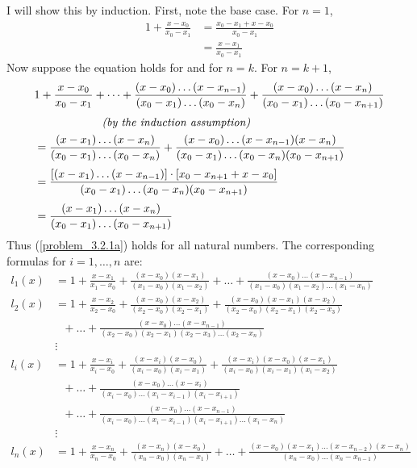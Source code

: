 \documentclass[12pt]{article}
\begin{document}
\noindent I will show this by induction.  First, note the base case.  For $n = 1$,
\begin{align*}
1 + \frac{x - x_0}{x_0 - x_1} &= \frac{x_0 - x_1 + x - x_0}{x_0 - x_1} \\
&= \frac{x - x_1}{x_0 - x_1}
\end{align*}
Now suppose the equation holds for and for $n = k$.  For $n = k+1$,
\begin{align*}
&1 + \frac{x - x_0}{x_0 - x_1} + \dots + \frac{(x - x_0)\dots(x - x_{n-1})}{(x_0 - x_1)\dots(x_0 - x_n)} + \frac{(x - x_0)\dots(x - x_n)}{(x_0 - x_1)\dots(x_0 - x_{n+1})} \\[.1cm]
&\ \ \ \ \ \ \ \ \ \ \ \ \ \ \ \ \ \ \text{\it (by the induction assumption)}\\
&= \frac{(x - x_1)\dots(x - x_n)}{(x_0 - x_1)\dots(x_0 - x_n)} + \frac{(x - x_0)\dots(x - x_{n-1})(x - x_n)}{(x_0 - x_1)\dots(x_0 - x_n)(x_0 - x_{n+1})} \\[.1cm]
&= \frac{[(x - x_1)\dots(x - x_{n-1})]\cdot[x_0 - x_{n+1} + x - x_0]}{(x_0 - x_1)\dots(x_0 - x_n)(x_0 - x_{n+1})} \\[.1cm]
&= \frac{(x - x_1)\dots(x - x_n)}{(x_0 - x_1)\dots(x_0 - x_{n+1})}
\end{align*}
Thus (\ref{problem_3.2.1a}) holds for all natural numbers.  The corresponding formulas for $i = 1, \dots, n$ are:
\begin{align*}
l_1(x) &= 1 + \frac{x - x_1}{x_1 - x_0} + \frac{(x - x_0)(x - x_1)}{(x_1 - x_0)(x_1 - x_2)} + \dots + \frac{(x - x_0)\dots(x - x_{n-1})}{(x_1 - x_0)(x_1 - x_2)\dots(x_1 - x_n)} \\[.1cm]
l_2(x) &= 1 + \frac{x - x_2}{x_2 - x_0} + \frac{(x - x_0)(x - x_2)}{(x_2 - x_0)(x_2 - x_1)} + \frac{(x - x_0)(x - x_1)(x - x_2)}{(x_2 - x_0)(x_2 - x_1)(x_2 - x_3)} \\[.1cm]
&\ \ \ + \dots + \frac{(x - x_0)\dots(x - x_{n-1})}{(x_2 - x_0)(x_2 - x_1)(x_2 - x_3)\dots(x_2 - x_n)}\\[.1cm]
&\vdots\\[.1cm]
l_i(x) &= 1 + \frac{x - x_i}{x_i - x_0} + \frac{(x - x_i)(x - x_0)}{(x_i - x_0)(x_i - x_1)} + \frac{(x - x_i)(x - x_0)(x - x_1)}{(x_i - x_0)(x_i - x_1)(x_i - x_2)} \\[.1cm]
&\ \ \ + \dots + \frac{(x - x_0)\dots(x - x_i)}{(x_i - x_0)\dots(x_i - x_{i-1})(x_i - x_{i+1})} \\[.1cm]
&\ \ \ + \dots + \frac{(x - x_0)\dots(x - x_{n-1})}{(x_i - x_0)\dots(x_i - x_{i-1})(x_i - x_{i+1})\dots(x_i - x_n)} \\[.1cm]
&\vdots\\[.1cm]
l_n(x) &= 1 + \frac{x - x_n}{x_n - x_0} + \frac{(x - x_n)(x - x_0)}{(x_n - x_0)(x_n - x_1)} + \dots + \frac{(x - x_0)(x - x_1)\dots(x - x_{n-2})(x - x_n)}{(x_n - x_0)\dots(x_n - x_{n-1})}
\end{align*}
\end{document}
